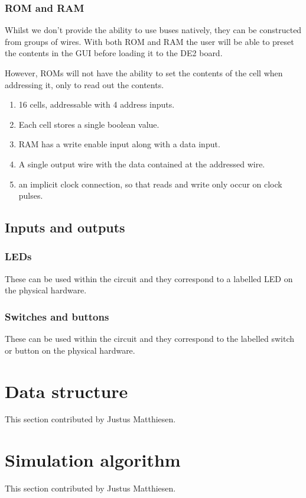 \documentclass[12pt, a4paper, oneside,titlepage]{article}
\begin{document}
\subsubsection{ROM and RAM}
Whilst we don't provide the ability to use buses natively, they can be constructed from groups of wires. With both ROM and RAM the user will be able to preset the contents in the GUI before loading it to the DE2 board. 

However, ROMs will not have the ability to set the contents of the cell when addressing it, only to read out the contents. 

\begin{enumerate}
\item 16 cells, addressable with 4 address inputs.
\item Each cell stores a single boolean value. 
\item RAM has a write enable input along with a data input.
\item A single output wire with the data contained at the addressed wire. 
\item an implicit clock connection, so that reads and write only occur on clock pulses.
\end{enumerate}

\subsection{Inputs and outputs}
\subsubsection{LEDs}
These can be used within the circuit and they correspond to a labelled LED on the physical hardware.
\subsubsection{Switches and buttons}
These can be used within the circuit and they correspond to the labelled switch or button on the physical hardware. 

\section{Data structure}
\label{sec:datastruct}
This section contributed by Justus Matthiesen.

\section{Simulation algorithm}
This section contributed by Justus Matthiesen. 
\end{document}
